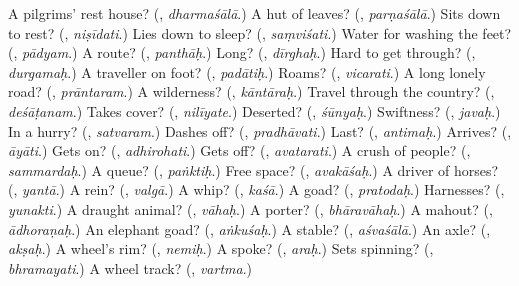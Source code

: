 \begin{tcolorbox}[breakable,colback=teal!4,colframe=teal!35!black,title={Before you move on}]
A pilgrims' rest house? (\textbf{}, \emph{dharmaśālā}.) A hut of leaves? (\textbf{}, \emph{parṇaśālā}.) Sits down to rest? (\textbf{}, \emph{niṣīdati}.) Lies down to sleep? (\textbf{}, \emph{saṃviśati}.) Water for washing the feet? (\textbf{}, \emph{pādyam}.) A route? (\textbf{}, \emph{panthāḥ}.) Long? (\textbf{}, \emph{dīrghaḥ}.) Hard to get through? (\textbf{}, \emph{durgamaḥ}.) A traveller on foot? (\textbf{}, \emph{padātiḥ}.) Roams? (\textbf{}, \emph{vicarati}.) A long lonely road? (\textbf{}, \emph{prāntaram}.) A wilderness? (\textbf{}, \emph{kāntāraḥ}.) Travel through the country? (\textbf{}, \emph{deśāṭanam}.) Takes cover? (\textbf{}, \emph{nilīyate}.) Deserted? (\textbf{}, \emph{śūnyaḥ}.) Swiftness? (\textbf{}, \emph{javaḥ}.) In a hurry? (\textbf{}, \emph{satvaram}.) Dashes off? (\textbf{}, \emph{pradhāvati}.) Last? (\textbf{}, \emph{antimaḥ}.) Arrives? (\textbf{}, \emph{āyāti}.) Gets on? (\textbf{}, \emph{adhirohati}.) Gets off? (\textbf{}, \emph{avatarati}.) A crush of people? (\textbf{}, \emph{sammardaḥ}.) A queue? (\textbf{}, \emph{paṅktiḥ}.) Free space? (\textbf{}, \emph{avakāśaḥ}.) A driver of horses? (\textbf{}, \emph{yantā}.) A rein? (\textbf{}, \emph{valgā}.) A whip? (\textbf{}, \emph{kaśā}.) A goad? (\textbf{}, \emph{pratodaḥ}.) Harnesses? (\textbf{}, \emph{yunakti}.) A draught animal? (\textbf{}, \emph{vāhaḥ}.) A porter? (\textbf{}, \emph{bhāravāhaḥ}.) A mahout? (\textbf{}, \emph{ādhoraṇaḥ}.) An elephant goad? (\textbf{}, \emph{aṅkuśaḥ}.) A stable? (\textbf{}, \emph{aśvaśālā}.) An axle? (\textbf{}, \emph{akṣaḥ}.) A wheel's rim? (\textbf{}, \emph{nemiḥ}.) A spoke? (\textbf{}, \emph{araḥ}.) Sets spinning? (\textbf{}, \emph{bhramayati}.) A wheel track? (\textbf{}, \emph{vartma}.)
\end{tcolorbox}
